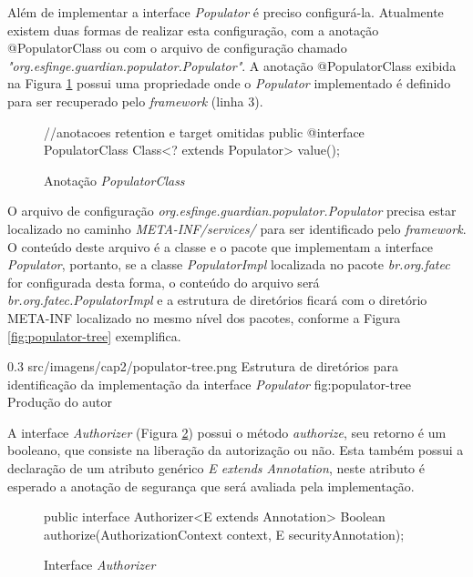 \par Além de implementar a interface \textit{Populator} é preciso configurá-la. Atualmente existem duas formas de realizar esta configuração, com a anotação @PopulatorClass ou com o arquivo de configuração chamado \textit{"org.esfinge.guardian.populator.Populator"}. A anotação @PopulatorClass exibida na Figura \ref{fig:populator-class} possui uma propriedade onde o \textit{Populator} implementado é definido para ser recuperado pelo \textit{framework} (linha 3).

\begin{figure}[H]
    \centering
    \caption{Anotação \textit{PopulatorClass}}
    \begin{java}
//anotacoes retention e target omitidas
public @interface PopulatorClass {
	Class<? extends Populator> value();
}
    \end{java}
    \label{fig:populator-class}
\end{figure}

\par O arquivo de configuração \textit{org.esfinge.guardian.populator.Populator} precisa estar localizado no caminho \textit{META-INF/services/} para ser identificado pelo \textit{framework}. O conteúdo deste arquivo é a classe e o pacote que implementam a interface \textit{Populator}, portanto, se a classe \textit{PopulatorImpl} localizada no pacote \textit{br.org.fatec} for configurada desta forma, o conteúdo do arquivo será \textit{br.org.fatec.PopulatorImpl} e a estrutura de diretórios ficará com o diretório META-INF localizado no mesmo nível dos pacotes, conforme a Figura \ref{fig:populator-tree} exemplifica.

\begin{image}
{0.3} %
{src/imagens/cap2/populator-tree.png} %
{Estrutura de diretórios para identificação da implementação da interface \textit{Populator}} %
{fig:populator-tree} %
{Produção do autor} %
\end{image}

\par A interface \textit{Authorizer} (Figura \ref{fig:interface-authorizer}) possui o método \textit{authorize}, seu retorno é um booleano, que consiste na liberação da autorização ou não. Esta também possui a declaração de um atributo genérico \textit{E extends Annotation}, neste atributo é esperado a anotação de segurança que será avaliada pela implementação. 

\begin{figure}[H]
    \centering
    \caption{Interface \textit{Authorizer}}
    \begin{java}
public interface Authorizer<E extends Annotation> {
	Boolean authorize(AuthorizationContext context, E securityAnnotation);
}
    \end{java}
    \label{fig:interface-authorizer}
\end{figure}

